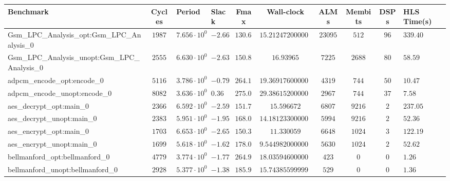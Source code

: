 \begin{tabular}{|l|c|HHc|c|c|c|cH|}
\hline
Benchmark                                       & Cycles       & Period                 & Slack     & Fmax       & Wall-clock               & ALMs       & Membits     & DSPs    & HLS Time(s) \\
\hline
Gsm\_LPC\_Analysis\_opt:Gsm\_LPC\_Analysis\_0   & $ 1987     $ & $ 7.656 \cdot 10^{0} $ & $ -2.66 $ & $ 130.62 $ & $ 15.212472000000002   $ & $ 23095  $ & $ 512     $ & $ 96  $ & $ 339.40  $ \\
Gsm\_LPC\_Analysis\_unopt:Gsm\_LPC\_Analysis\_0 & $ 2555     $ & $ 6.630 \cdot 10^{0} $ & $ -2.63 $ & $ 150.83 $ & $ 16.93965             $ & $ 7225   $ & $ 2688    $ & $ 80  $ & $ 58.59   $ \\
adpcm\_encode\_opt:encode\_0                    & $ 5116     $ & $ 3.786 \cdot 10^{0} $ & $ -0.79 $ & $ 264.13 $ & $ 19.369176000000003   $ & $ 4319   $ & $ 744     $ & $ 50  $ & $ 10.47   $ \\
adpcm\_encode\_unopt:encode\_0                  & $ 8082     $ & $ 3.636 \cdot 10^{0} $ & $ 0.36  $ & $ 275.03 $ & $ 29.386152000000003   $ & $ 2967   $ & $ 744     $ & $ 37  $ & $ 7.58    $ \\
aes\_decrypt\_opt:main\_0                       & $ 2366     $ & $ 6.592 \cdot 10^{0} $ & $ -2.59 $ & $ 151.70 $ & $ 15.596672            $ & $ 6807   $ & $ 9216    $ & $ 2   $ & $ 237.05  $ \\
aes\_decrypt\_unopt:main\_0                     & $ 2383     $ & $ 5.951 \cdot 10^{0} $ & $ -1.95 $ & $ 168.04 $ & $ 14.181233000000002   $ & $ 5994   $ & $ 9216    $ & $ 2   $ & $ 52.36   $ \\
aes\_encrypt\_opt:main\_0                       & $ 1703     $ & $ 6.653 \cdot 10^{0} $ & $ -2.65 $ & $ 150.31 $ & $ 11.330059            $ & $ 6648   $ & $ 1024    $ & $ 3   $ & $ 122.19  $ \\
aes\_encrypt\_unopt:main\_0                     & $ 1699     $ & $ 5.618 \cdot 10^{0} $ & $ -1.62 $ & $ 178.00 $ & $ 9.544982000000001    $ & $ 5630   $ & $ 1024    $ & $ 2   $ & $ 52.62   $ \\
bellmanford\_opt:bellmanford\_0                 & $ 4779     $ & $ 3.774 \cdot 10^{0} $ & $ -1.77 $ & $ 264.97 $ & $ 18.035946000000003   $ & $ 423    $ & $ 0       $ & $ 0   $ & $ 1.26    $ \\
bellmanford\_unopt:bellmanford\_0               & $ 2928     $ & $ 5.377 \cdot 10^{0} $ & $ -1.38 $ & $ 185.98 $ & $ 15.743855999999999   $ & $ 529    $ & $ 0       $ & $ 0   $ & $ 1.36    $ \\

\end{tabular}

